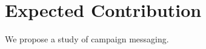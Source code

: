 \documentclass{article}
\begin{document}
\section{Expected Contribution}
We propose a study of campaign messaging.
\end{document}

